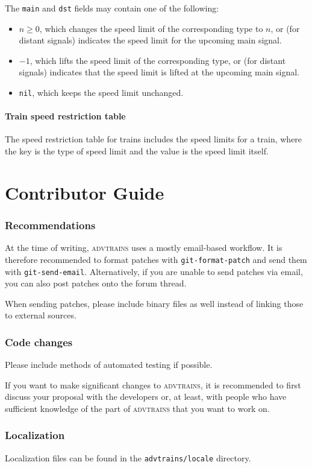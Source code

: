 \documentclass[notitlepage]{article}
\def\luanil{\texttt{nil}}
\def\advtrains{\textsc{advtrains}}
\begin{document}
The \texttt{main} and \texttt{dst} fields may contain one of the following:
\begin{itemize}
\item $n \geq 0$, which changes the speed limit of the corresponding type to $n$, or (for distant signals) indicates the speed limit for the upcoming main signal.
\item $-1$, which lifts the speed limit of the corresponding type, or (for distant signals) indicates that the speed limit is lifted at the upcoming main signal.
\item \luanil, which keeps the speed limit unchanged.
\end{itemize}

\subsection{Train speed restriction table}
The speed restriction table for trains includes the speed limits for a train, where the key is the type of speed limit and the value is the speed limit itself.

\part{Contributor Guide}

\section{Recommendations}
At the time of writing, \advtrains{} uses a mostly email-based workflow. It is therefore recommended to format patches with \texttt{git-format-patch} and send them with \texttt{git-send-email}. Alternatively, if you are unable to send patches via email, you can also post patches onto the forum thread.

When sending patches, please include binary files as well instead of linking those to external sources.

\section{Code changes}
Please include methods of automated testing if possible.

If you want to make significant changes to \advtrains{}, it is recommended to first discuss your proposal with the developers or, at least, with people who have sufficient knowledge of the part of \advtrains{} that you want to work on.

\section{Localization}
Localization files can be found in the \texttt{advtrains/locale} directory.
\end{document}
